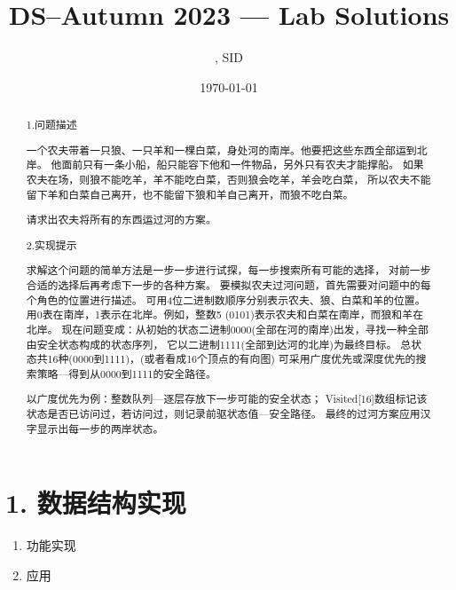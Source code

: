 \documentclass[UTF8]{ctexart}
\title{DS--Autumn 2023 --- Lab \Lab    Solutions} %
\author{\Name, SID \SID} %
\date{\today} %
\newenvironment{qparts}{\begin{enumerate}[{(}a{)}]}{\end{enumerate}} %
\begin{document}
\maketitle


\begin{abstract}

    1.问题描述

    一个农夫带着一只狼、一只羊和一棵白菜，身处河的南岸。他要把这些东西全部运到北岸。
    他面前只有一条小船，船只能容下他和一件物品，另外只有农夫才能撑船。
    如果农夫在场，则狼不能吃羊，羊不能吃白菜，否则狼会吃羊，羊会吃白菜，
    所以农夫不能留下羊和白菜自己离开，也不能留下狼和羊自己离开，而狼不吃白菜。

    请求出农夫将所有的东西运过河的方案。

    2.实现提示

    求解这个问题的简单方法是一步一步进行试探，每一步搜索所有可能的选择，
    对前一步合适的选择后再考虑下一步的各种方案。
    要模拟农夫过河问题，首先需要对问题中的每个角色的位置进行描述。
    可用4位二进制数顺序分别表示农夫、狼、白菜和羊的位置。
    用0表在南岸，1表示在北岸。例如，整数5 (0101)表示农夫和白菜在南岸，而狼和羊在北岸。
    现在问题变成：从初始的状态二进制0000(全部在河的南岸)出发，寻找一种全部由安全状态构成的状态序列，
    它以二进制1111(全部到达河的北岸)为最终目标。
    总状态共16种(0000到1111)，(或者看成16个顶点的有向图)
    可采用广度优先或深度优先的搜索策略---得到从0000到1111的安全路径。

    以广度优先为例：整数队列---逐层存放下一步可能的安全状态；
    Visited[16]数组标记该状态是否已访问过，若访问过，则记录前驱状态值---安全路径。
    最终的过河方案应用汉字显示出每一步的两岸状态。

\end{abstract}







\section*{1. 数据结构实现}
\begin{qparts}
    \item 功能实现


    \item 应用 
    
\end{qparts}
\end{document}
